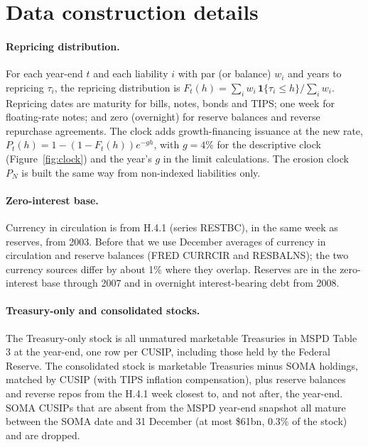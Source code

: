 \section{Data construction details}\label{app:data}

\paragraph{Repricing distribution.} For each year-end $t$ and each liability $i$ with par (or balance) $w_i$ and years to repricing $\tau_i$, the repricing distribution is $F_t(h)=\sum_i w_i\,\mathbf 1\{\tau_i\le h\}/\sum_i w_i$. Repricing dates are maturity for bills, notes, bonds and TIPS; one week for floating-rate notes; and zero (overnight) for reserve balances and reverse repurchase agreements. The clock adds growth-financing issuance at the new rate, $P_t(h)=1-(1-F_t(h))e^{-gh}$, with $g=4\%$ for the descriptive clock (Figure~\ref{fig:clock}) and the year's $g$ in the limit calculations. The erosion clock $P_N$ is built the same way from non-indexed liabilities only.

\paragraph{Zero-interest base.} Currency in circulation is from H.4.1 (series RESTBC), in the same week as reserves, from 2003. Before that we use December averages of currency in circulation and reserve balances (FRED CURRCIR and RESBALNS); the two currency sources differ by about 1\% where they overlap. Reserves are in the zero-interest base through 2007 and in overnight interest-bearing debt from 2008.

\paragraph{Treasury-only and consolidated stocks.} The Treasury-only stock is all unmatured marketable Treasuries in MSPD Table 3 at the year-end, one row per CUSIP, including those held by the Federal Reserve. The consolidated stock is marketable Treasuries minus SOMA holdings, matched by CUSIP (with TIPS inflation compensation), plus reserve balances and reverse repos from the H.4.1 week closest to, and not after, the year-end. SOMA CUSIPs that are absent from the MSPD year-end snapshot all mature between the SOMA date and 31 December (at most \$61bn, 0.3\% of the stock) and are dropped.

